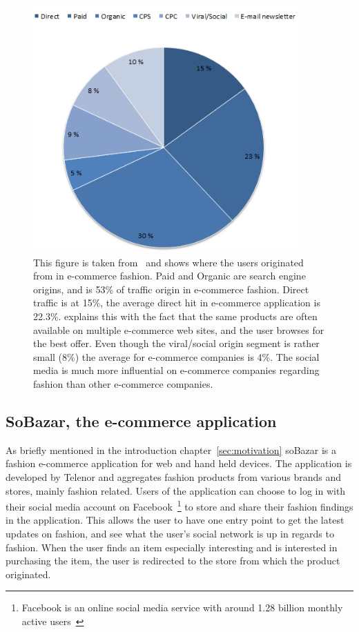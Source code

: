   \begin{figure}[H]
      \includegraphics[width=4in]{image/trafficsources.png}
      \centering
      \caption[Traffic Sources In Fashion]{This figure is taken from~\cite{Jorij2012} and shows where the users originated from in e-commerce fashion.
      Paid and Organic are search engine origins, and is 53\% of traffic origin in e-commerce fashion.
      Direct traffic is at 15\%, the average direct hit in e-commerce application is 22.3\%.
      \cite{Jorij2012} explains this with the fact that the same products are often available on multiple e-commerce web sites, and the user browses for the best offer.
      Even though the viral/social origin segment is rather small (8\%) the average for e-commerce companies is 4\%.
      The social media is much more influential on e-commerce companies regarding fashion than other e-commerce companies.}
  \end{figure}


\subsection{SoBazar, the e-commerce application}
  As briefly mentioned in the introduction chapter~\ref{sec:motivation} soBazar is a fashion e-commerce application for web and hand held devices.
  The application is developed by Telenor and aggregates fashion products from various brands and stores, mainly fashion related.
  Users of the application can choose to log in with their social media account on Facebook~\footnote{Facebook is an online social media service with around 1.28 billion monthly active users~\cite{facebook}} to store and share their fashion findings in the application.
  This allows the user to have one entry point to get the latest updates on fashion, and see what the user's social network is up in regards to fashion.
  When the user finds an item especially interesting and is interested in purchasing the item, the user is redirected to the store from which the product originated.

